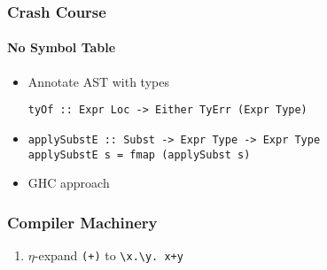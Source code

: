 \documentclass{beamer}
\begin{document}
\begin{frame}[fragile]
  \frametitle{Crash Course}
  \framesubtitle{No Symbol Table}
  \begin{itemize}
      \item Annotate AST with types
        \begin{verbatim}
tyOf :: Expr Loc -> Either TyErr (Expr Type)
        \end{verbatim}
      \item
        \begin{verbatim}
applySubstE :: Subst -> Expr Type -> Expr Type
applySubstE s = fmap (applySubst s)
        \end{verbatim}
      \item GHC approach
  \end{itemize}
\end{frame}

\begin{frame}[fragile]
  \frametitle{Compiler Machinery}
  \begin{enumerate}
    \item $\eta$-expand \verb|(+)| to \verb|\x.\y. x+y|
  \end{enumerate}
\end{frame}
\end{document}
